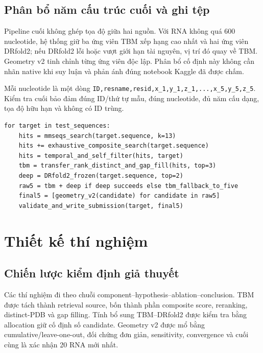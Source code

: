 \documentclass[12pt,a4paper,oneside]{report}
\begin{document}
\fi

\section{Phân bổ năm cấu trúc cuối và ghi tệp}

Pipeline cuối không ghép tọa độ giữa hai nguồn. Với RNA không quá 600 nucleotide, hệ
thống giữ ba ứng viên TBM xếp hạng cao nhất và hai ứng viên DRfold2; nếu DRfold2 lỗi
hoặc vượt giới hạn tài nguyên, vị trí đó quay về TBM. Geometry v2 tinh chỉnh từng ứng
viên độc lập. Phân bổ cố định này không cần nhãn native khi suy luận và phản ánh đúng
notebook Kaggle đã được chấm.

Mỗi nucleotide là một dòng \texttt{ID,resname,resid,x\_1,y\_1,z\_1,...,x\_5,y\_5,z\_5}.
Kiểm tra cuối bảo đảm đúng ID/thứ tự mẫu, đúng nucleotide, đủ năm cấu dạng, tọa độ hữu
hạn và không có ID trùng.

\begin{lstlisting}
for target in test_sequences:
    hits = mmseqs_search(target.sequence, k=13)
    hits += exhaustive_composite_search(target.sequence)
    hits = temporal_and_self_filter(hits, target)
    tbm = transfer_rank_distinct_and_gap_fill(hits, top=3)
    deep = DRfold2_frozen(target.sequence, top=2)
    raw5 = tbm + deep if deep succeeds else tbm_fallback_to_five
    final5 = [geometry_v2(candidate) for candidate in raw5]
    validate_and_write_submission(target, final5)
\end{lstlisting}

\chapter{Thiết kế thí nghiệm}

\section{Chiến lược kiểm định giả thuyết}

Các thí nghiệm đi theo chuỗi component--hypothesis--ablation--conclusion. TBM được tách
thành retrieval source, bốn thành phần composite score, reranking, distinct-PDB và gap
filling. Tính bổ sung TBM--DRfold2 được kiểm tra bằng allocation giữ cố định số candidate.
Geometry v2 được mổ bằng cumulative/leave-one-out, đối chứng đơn giản, sensitivity,
convergence và cuối cùng là xác nhận 20 RNA mới nhất.
\end{document}
